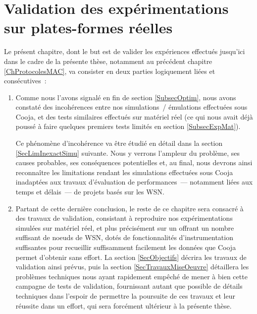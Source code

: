 
\chapter{Validation des expérimentations sur plates-formes réelles}
\label{ChValidation}

Le présent chapitre, dont le but est de valider les expériences effectués
jusqu'ici dans le cadre de la présente thèse, notamment au précédent
chapitre \ref{ChProtocolesMAC}, va consister en deux parties logiquement
liées et consécutives~:

\begin{enumerate}

\item Comme nous l'avons signalé en fin de section \vref{SubsecOptim},
nous avons constaté des incohérences entre nos simulations~/ émulations
effectuées sous Cooja, et des tests similaires effectués sur matériel réel
(ce qui nous avait déjà poussé à faire quelques premiers tests limités en
section \vref{SubsecExpMat}).

Ce phénomène d'incohérence va être étudié en détail dans la section
\ref{SecLimInexactSimu} suivante. Nous y verrons l'ampleur du problème,
ses causes probables, ses conséquences potentielles et, au final, nous
devrons ainsi reconnaître les limitations rendant les simulations
effectuées sous Cooja inadaptées aux travaux d'évaluation de performances~---
notamment liées aux temps et délais~--- de projets basés sur les WSN.

\item Partant de cette dernière conclusion, le reste de ce chapitre
sera consacré à des travaux de validation, consistant à reproduire nos
expérimentations simulées sur matériel réel, et plus précisément sur
un  offrant un nombre suffisant de noeuds de WSN, dotés
de fonctionnalités d'instrumentation suffisantes pour recueillir
suffisamment facilement les données que Cooja permet d'obtenir sans
effort. La section \vref{SecObjectifs} décrira les travaux de validation
ainsi prévus, puis la section \vref{SecTravauxMiseOeuvre} détaillera les
problèmes techniques nous ayant rapidement empêché de mener à bien cette
campagne de tests de validation, fournissant autant que possible de détails
techniques dans l'espoir de permettre la poursuite de ces travaux et leur
réussite dans un effort, qui sera forcément ultérieur à la présente thèse.

\end{enumerate}

